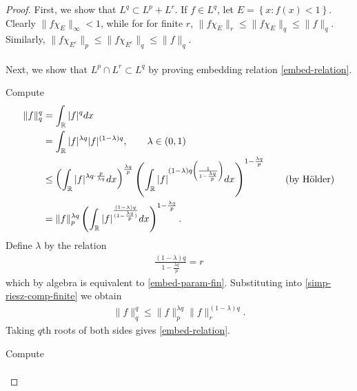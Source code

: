 \begin{proof}
First, we show that $L^q \subset L^p + L^r$. If $f \in L^q$, let $E = \left\{ x:
f(x) <1 \right\}$. Clearly $\|f \chi_{E}\|_{\infty} < 1$, while for for finite $r$, $\| f \chi_{E} \|_{r} \le \|f \chi_{E} \|_{q} \le \| f
\|_{q}$. Similarly, $\| f \chi_{E^c} \|_{p} \le \|f \chi_{E^c} \|_{q} \le \|f\|_{q}$. 
\\
\\
Next, we show that $L^{p} \cap L^{r} \subset L^{q}$ by proving embedding relation
\eqref{embed-relation}.
\begin{case}[$r < \infty$]
Compute
%
\begin{equation}
	\label{simp-riesz-comp-finite}
	\begin{split}
		\| f \|_{q}^{q}
		& = \int_{\mathbb{R}} | f |^{q}dx
		\\
		& = \int_{\mathbb{R}} | f |^{\lambda q} | f |^{(1-\lambda)q}, \qquad \lambda \in
		(0,1)
		\\
		& \le \left( \int_{\mathbb{R}} | f |^{\lambda q \cdot \frac{p}{\lambda q}}dx
		\right)^{\frac{\lambda q}{p}}
		\left( \int_{\mathbb{R}}| f |^{(1- \lambda)q \left(
		\frac{1}{1-\frac{\lambda q}{p}}
		\right)} dx \right)^{1- \frac{\lambda q}{p}} \qquad \text{(by H{\"o}lder)}
		\\
		& =\| f \|_{p}^{\lambda q} \left( \int_{\mathbb{R}} | f |^{\frac{(1 -
		\lambda)q}{(1 - \frac{\lambda q}{p})}}dx \right)^{1- \frac{\lambda q}{p}}.
	\end{split}
\end{equation}
%
%
Define $\lambda$ by the relation	%
%
\begin{equation*}
	\begin{split}
		\frac{(1 - \lambda)q}{1 - \frac{\lambda q}{p}} = r
	\end{split}
\end{equation*}
%
%
which by algebra is equivalent to \eqref{embed-param-fin}.
%
%
%
%
%
Substituting into \eqref{simp-riesz-comp-finite} we obtain
%
%
\begin{equation*}
	\begin{split}
		\|f\|_{q}^{q} \le \| f \|_{p}^{\lambda q} \| f \|_{r}^{(1 - \lambda)q}.
	\end{split}
\end{equation*}
%
%
Taking $q$th roots of both sides gives \eqref{embed-relation}.
\end{case}	
%
%
\begin{case}[$r = \infty$]
Compute
%
\begin{equation}
	\label{simp-riesz-comp-infty}
	\begin{split}

\end{split}
\end{equation}
\end{case}
\end{proof}
